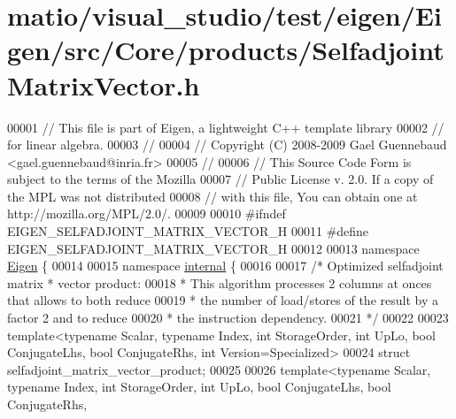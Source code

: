 \hypertarget{matio_2visual__studio_2test_2eigen_2_eigen_2src_2_core_2products_2_selfadjoint_matrix_vector_8h_source}{}\section{matio/visual\+\_\+studio/test/eigen/\+Eigen/src/\+Core/products/\+Selfadjoint\+Matrix\+Vector.h}
\label{matio_2visual__studio_2test_2eigen_2_eigen_2src_2_core_2products_2_selfadjoint_matrix_vector_8h_source}

\begin{DoxyCode}
00001 \textcolor{comment}{// This file is part of Eigen, a lightweight C++ template library}
00002 \textcolor{comment}{// for linear algebra.}
00003 \textcolor{comment}{//}
00004 \textcolor{comment}{// Copyright (C) 2008-2009 Gael Guennebaud <gael.guennebaud@inria.fr>}
00005 \textcolor{comment}{//}
00006 \textcolor{comment}{// This Source Code Form is subject to the terms of the Mozilla}
00007 \textcolor{comment}{// Public License v. 2.0. If a copy of the MPL was not distributed}
00008 \textcolor{comment}{// with this file, You can obtain one at http://mozilla.org/MPL/2.0/.}
00009 
00010 \textcolor{preprocessor}{#ifndef EIGEN\_SELFADJOINT\_MATRIX\_VECTOR\_H}
00011 \textcolor{preprocessor}{#define EIGEN\_SELFADJOINT\_MATRIX\_VECTOR\_H}
00012 
00013 \textcolor{keyword}{namespace }\hyperlink{namespace_eigen}{Eigen} \{ 
00014 
00015 \textcolor{keyword}{namespace }\hyperlink{namespaceinternal}{internal} \{
00016 
00017 \textcolor{comment}{/* Optimized selfadjoint matrix * vector product:}
00018 \textcolor{comment}{ * This algorithm processes 2 columns at onces that allows to both reduce}
00019 \textcolor{comment}{ * the number of load/stores of the result by a factor 2 and to reduce}
00020 \textcolor{comment}{ * the instruction dependency.}
00021 \textcolor{comment}{ */}
00022 
00023 \textcolor{keyword}{template}<\textcolor{keyword}{typename} Scalar, \textcolor{keyword}{typename} Index, \textcolor{keywordtype}{int} StorageOrder, \textcolor{keywordtype}{int} UpLo, \textcolor{keywordtype}{bool} ConjugateLhs, \textcolor{keywordtype}{bool} ConjugateRhs,
       \textcolor{keywordtype}{int} Version=Specialized>
00024 \textcolor{keyword}{struct }selfadjoint\_matrix\_vector\_product;
00025 
00026 \textcolor{keyword}{template}<\textcolor{keyword}{typename} Scalar, \textcolor{keyword}{typename} Index, \textcolor{keywordtype}{int} StorageOrder, \textcolor{keywordtype}{int} UpLo, \textcolor{keywordtype}{bool} ConjugateLhs, \textcolor{keywordtype}{bool} ConjugateRhs,

\end{DoxyCode}
